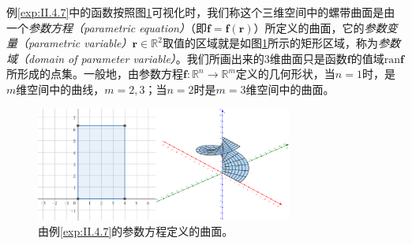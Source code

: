 \documentclass[main.tex]{subfiles}
\begin{document}
例\ref{exp:II.4.7}中的函数按照图\ref{fig:II.4.4}可视化时，我们称这个三维空间中的螺带曲面是由一个\emph{参数方程（parametric equation）}（即$\mathbf{f}=\mathbf{f}\left(\mathbf{r}\right)$）所定义的曲面，它的\emph{参数变量（parametric variable）}$\mathbf{r}\in\mathbb{R}^2$取值的区域就是如图\ref{fig:II.4.4}所示的矩形区域，称为\emph{参数域（domain of parameter variable）}。我们所画出来的3维曲面只是函数$\mathbf{f}$的值域$\mathrm{ran}\mathbf{f}$所形成的点集。一般地，由参数方程$\mathbf{f}:\mathbb{R}^n\rightarrow\mathbb{R}^m$定义的几何形状，当$n=1$时，是$m$维空间中的曲线，$m=2,3$；当$n=2$时是$m=3$维空间中的曲面。

\begin{figure}[h]
    \centering
    \includegraphics[width=0.75\textwidth]{images/II.4.4.png}
    \caption{由例\ref{exp:II.4.7}的参数方程定义的曲面。}
    \label{fig:II.4.4}
\end{figure}
\end{document}
